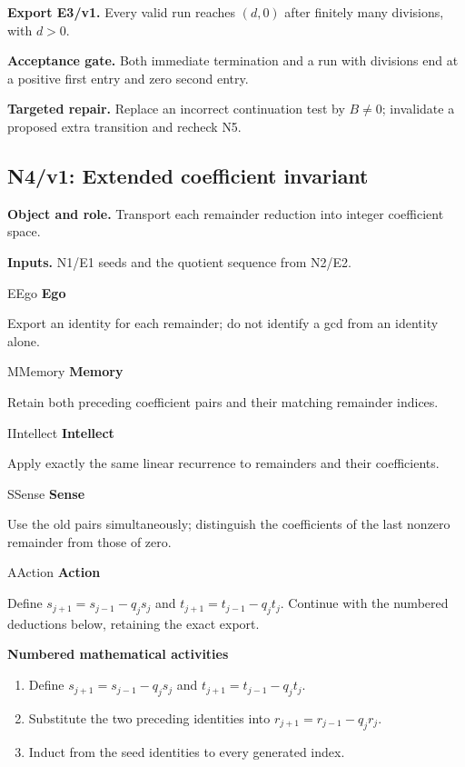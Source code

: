 \documentclass[preprint,12pt,aps,pra,showkeys,amsmath,amssymb,superscriptaddress,floatfix]{revtex4-2}
\theoremstyle{definition}
\theoremstyle{remark}
\newcommand{\mmfaculty}[3]{%
 \begin{mmfacultybox}{#1}{#2}
 {\sffamily\bfseries\color{MMBlue}#2}\par\smallskip #3
 \end{mmfacultybox}}
\newcommand{\field}[2]{\par\smallskip\noindent\textbf{#1.} #2\par}
\begin{document}
\field{Export E3/v1}{Every valid run reaches \((d,0)\) after finitely many divisions, with
\(d>0\).}

\field{Acceptance gate}{Both immediate termination and a run with divisions end at a positive
first entry and zero second entry.}

\field{Targeted repair}{Replace an incorrect continuation test by \(B\ne0\); invalidate a
proposed extra transition and recheck N5.}

\clearpage

\subsection{N4/v1: Extended coefficient invariant}

\field{Object and role}{Transport each remainder reduction into integer coefficient space.}

\field{Inputs}{N1/E1 seeds and the quotient sequence from N2/E2.}

\mmfaculty{E}{Ego}{Export an identity for each remainder; do not identify a gcd from an
identity alone.}

\mmfaculty{M}{Memory}{Retain both preceding coefficient pairs and their matching remainder
indices.}

\mmfaculty{I}{Intellect}{Apply exactly the same linear recurrence to remainders and their
coefficients.}

\mmfaculty{S}{Sense}{Use the old pairs simultaneously; distinguish the coefficients of the
last nonzero remainder from those of zero.}

\mmfaculty{A}{Action}{Define \(s_{j+1}=s_{j-1}-q_js_j\) and \(t_{j+1}=t_{j-1}-q_jt_j\).
Continue with the numbered deductions below, retaining the exact export.}

\smallskip\noindent\textbf{Numbered mathematical activities}

\begin{enumerate}[label=N4.\arabic*,leftmargin=3.4em]

\item Define \(s_{j+1}=s_{j-1}-q_js_j\) and \(t_{j+1}=t_{j-1}-q_jt_j\).

\item Substitute the two preceding identities into \(r_{j+1}=r_{j-1}-q_jr_j\).

\item Induct from the seed identities to every generated index.

\end{enumerate}
\end{document}
